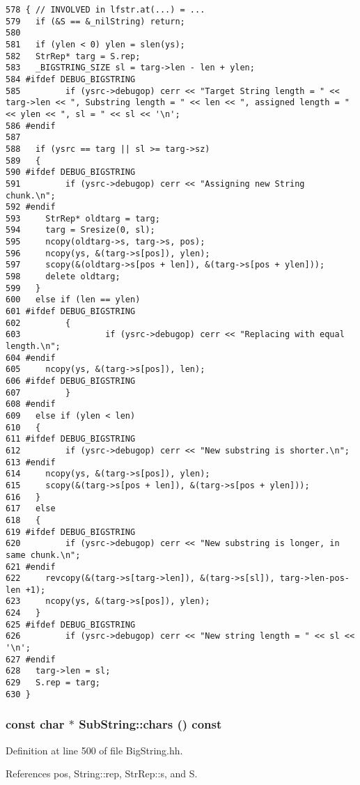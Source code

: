 \footnotesize\begin{verbatim}578 { // INVOLVED in lfstr.at(...) = ...
579   if (&S == &_nilString) return;
580 
581   if (ylen < 0) ylen = slen(ys);
582   StrRep* targ = S.rep;
583   _BIGSTRING_SIZE sl = targ->len - len + ylen;
584 #ifdef DEBUG_BIGSTRING
585         if (ysrc->debugop) cerr << "Target String length = " << targ->len << ", Substring length = " << len << ", assigned length = " << ylen << ", sl = " << sl << '\n';
586 #endif
587 
588   if (ysrc == targ || sl >= targ->sz)
589   {
590 #ifdef DEBUG_BIGSTRING
591         if (ysrc->debugop) cerr << "Assigning new String chunk.\n";
592 #endif
593     StrRep* oldtarg = targ;
594     targ = Sresize(0, sl);
595     ncopy(oldtarg->s, targ->s, pos);
596     ncopy(ys, &(targ->s[pos]), ylen);
597     scopy(&(oldtarg->s[pos + len]), &(targ->s[pos + ylen]));
598     delete oldtarg;
599   }
600   else if (len == ylen)
601 #ifdef DEBUG_BIGSTRING
602         {
603                 if (ysrc->debugop) cerr << "Replacing with equal length.\n";
604 #endif
605     ncopy(ys, &(targ->s[pos]), len);
606 #ifdef DEBUG_BIGSTRING
607         }
608 #endif
609   else if (ylen < len)
610   {
611 #ifdef DEBUG_BIGSTRING
612         if (ysrc->debugop) cerr << "New substring is shorter.\n";
613 #endif
614     ncopy(ys, &(targ->s[pos]), ylen);
615     scopy(&(targ->s[pos + len]), &(targ->s[pos + ylen]));
616   }
617   else
618   {
619 #ifdef DEBUG_BIGSTRING
620         if (ysrc->debugop) cerr << "New substring is longer, in same chunk.\n";
621 #endif
622     revcopy(&(targ->s[targ->len]), &(targ->s[sl]), targ->len-pos-len +1);
623     ncopy(ys, &(targ->s[pos]), ylen);
624   }
625 #ifdef DEBUG_BIGSTRING
626         if (ysrc->debugop) cerr << "New string length = " << sl << '\n';
627 #endif
628   targ->len = sl;
629   S.rep = targ;
630 }
\end{verbatim}\normalsize 
{}
\subsubsection{\setlength{\rightskip}{0pt plus 5cm}const char $\ast$ Sub\-String::chars () const\hspace{0.3cm}{\tt  [inline]}}\label{classSubString_a13}




Definition at line 500 of file Big\-String.hh.

References pos, String::rep, Str\-Rep::s, and S.

